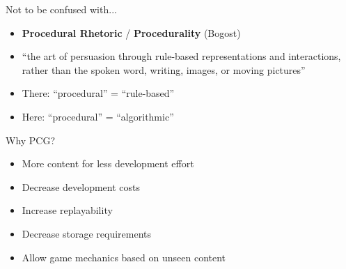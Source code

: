 \begin{frame}{Not to be confused with...}
	\begin{itemize}
		\pause\item \textbf{Procedural Rhetoric} / \textbf{Procedurality} (Bogost)
		\pause\item ``the art of persuasion through rule-based representations and interactions,
			rather than the spoken word, writing, images, or moving pictures''
		\pause\item There: ``procedural'' = ``rule-based''
		\pause\item Here: ``procedural'' = ``algorithmic''
	\end{itemize}
\end{frame}

\begin{frame}{Why PCG?}
	\begin{itemize}
		\pause\item More content for less development effort
		\pause\item Decrease development costs
		\pause\item Increase replayability
		\pause\item Decrease storage requirements
		\pause\item Allow game mechanics based on unseen content
	\end{itemize}
\end{frame}

